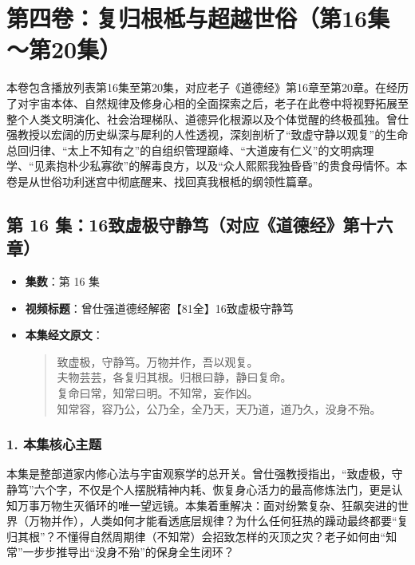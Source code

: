 \section*{第四卷：复归根柢与超越世俗（第16集～第20集）}

本卷包含播放列表第16集至第20集，对应老子《道德经》第16章至第20章。在经历了对宇宙本体、自然规律及修身心相的全面探索之后，老子在此卷中将视野拓展至整个人类文明演化、社会治理梯队、道德异化根源以及个体觉醒的终极孤独。曾仕强教授以宏阔的历史纵深与犀利的人性透视，深刻剖析了“致虚守静以观复”的生命总回归律、“太上不知有之”的自组织管理巅峰、“大道废有仁义”的文明病理学、“见素抱朴少私寡欲”的解毒良方，以及“众人熙熙我独昏昏”的贵食母情怀。本卷是从世俗功利迷宫中彻底醒来、找回真我根柢的纲领性篇章。

\clearpage

\subsection{第 16 集：16致虚极守静笃（对应《道德经》第十六章）}
\label{sec:ep16}

\begin{itemize}
    \item \textbf{集数}：第 16 集
    \item \textbf{视频标题}：曾仕强道德经解密【81全】16致虚极守静笃
    
    \item \textbf{本集经文原文}：
    \begin{quote}\kaishu
    致虚极，守静笃。万物并作，吾以观复。\\
    夫物芸芸，各复归其根。归根曰静，静曰复命。\\
    复命曰常，知常曰明。不知常，妄作凶。\\
    知常容，容乃公，公乃全，全乃天，天乃道，道乃久，没身不殆。
    \end{quote}
\end{itemize}

\subsubsection{1. 本集核心主题}
本集是整部道家内修心法与宇宙观察学的总开关。曾仕强教授指出，“致虚极，守静笃”六个字，不仅是个人摆脱精神内耗、恢复身心活力的最高修炼法门，更是认知万事万物生灭循环的唯一望远镜。本集着重解决：面对纷繁复杂、狂飙突进的世界（万物并作），人类如何才能看透底层规律？为什么任何狂热的躁动最终都要“复归其根”？不懂得自然周期律（不知常）会招致怎样的灭顶之灾？老子如何由“知常”一步步推导出“没身不殆”的保身全生闭环？

